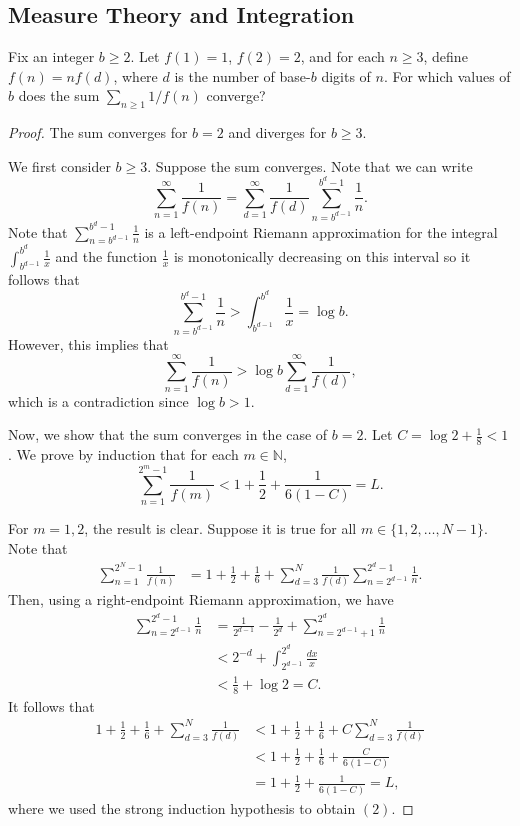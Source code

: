 \documentclass[11pt]{article}
\newcommand{\N}{\mathbb{N}}
\renewcommand{\>}{\rangle}
\newcommand{\<}{\langle}
\begin{document}
\subsection{Measure Theory and Integration}
\begin{problem}[Putnam 2002/A6] Fix an integer $b \ge 2$.  Let $f(1) = 1$, $f(2) = 2$, and for each $n \ge 3$, define $f(n) = nf(d)$, where $d$ is the number of base-$b$ digits of $n$.  For which values of $b$ does the sum $\sum_{n \ge 1} 1/f(n)$ converge?
\end{problem}


\begin{proof}
The sum converges for $b = 2$ and diverges for $b \ge 3$.  

We first consider $b \ge 3$.  Suppose the sum converges.  Note that we can write 
$$\sum_{n = 1}^\infty \frac{1}{f(n)} = \sum_{d = 1}^\infty \frac{1}{f(d)}\sum_{n = b^{d-1}}^{b^{d} - 1} \frac{1}{n}.$$
Note that $\sum_{n = b^{d-1}}^{b^d - 1} \frac{1}{n}$ is a left-endpoint Riemann approximation for the integral $\int_{b^{d-1}}^{b^d} \frac{1}{x}$ and the function $\frac{1}{x}$ is monotonically decreasing on this interval so it follows that 
$$\sum_{n = b^{d-1}}^{b^d - 1} \frac{1}{n} > \int_{b^{d-1}}^{b^d} \frac{1}{x} = \log b.$$
However, this implies that 
$$\sum_{n = 1}^\infty \frac{1}{f(n)} > \log b \sum_{d = 1}^\infty \frac{1}{f(d)},$$
which is a contradiction since $\log b > 1$.


Now, we show that the sum converges in the case of $b = 2$.  Let $C = \log 2 + \frac{1}{8} < 1$.  We prove by induction that for each $m \in \N$, $$\sum_{n=1}^{2^{m} - 1} \frac{1}{f(m)} < 1 + \frac{1}{2} + \frac{1}{6(1-C)} = L.$$

For $m = 1, 2$, the result is clear.  Suppose it is true for all $m \in \{1, 2, \dots, N-1\}$.  Note that 
\begin{align*}
\sum_{n=1}^{2^N - 1} \frac{1}{f(n)} &= 1 + \frac{1}{2} + \frac{1}{6} + \sum_{d=3}^N \frac{1}{f(d)} \sum_{n = 2^{d - 1}}^{2^d - 1} \frac{1}{n}.
\end{align*}
Then, using a right-endpoint Riemann approximation, we have 
\begin{align*}
\sum_{n = 2^{d-1}}^{2^d - 1} \frac{1}{n} &= \frac{1}{2^{d - 1}} - \frac{1}{2^{d}} + \sum_{n = 2^{d-1}+1}^{2^d} \frac{1}{n} \\
&< 2^{-d} + \int_{2^{d-1}}^{2^d} \frac{dx}{x} \\
&< \frac{1}{8} + \log 2 = C.
\end{align*}
It follows that 
\begin{align}
1 + \frac{1}{2} + \frac{1}{6} + \sum_{d=3}^N \frac{1}{f(d)} &< 1 + \frac{1}{2} + \frac{1}{6} + C \sum_{d = 3}^N \frac{1}{ f(d)} \\
&< 1 + \frac{1}{2} + \frac{1}{6} + \frac{C}{6(1 - C)} \\
&= 1 + \frac{1}{2} + \frac{1}{6(1-C)} = L,
\end{align}
where we used the strong induction hypothesis to obtain $(2)$.
\end{proof}
\end{document}
